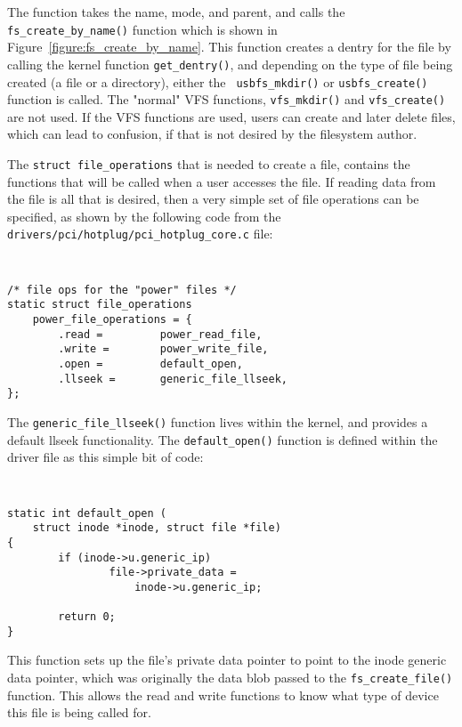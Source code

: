 \documentclass[twocolumn]{article}
\begin{document}
The function takes the name, mode, and parent, and calls the 
{\tt fs\_create\_by\_name()} function which is shown in 
Figure~\ref{figure:fs_create_by_name}.  This function creates a dentry for
the file by calling the kernel function {\tt get\_dentry()}, and depending
on the type of file being created (a file or a directory), either the {\tt
usbfs\_mkdir()} or {\tt usbfs\_create()} function is called.  The "normal"
VFS functions, {\tt vfs\_mkdir()} and {\tt vfs\_create()} are not used.  If
the VFS functions are used, users can create and later delete files, which
can lead to confusion, if that is not desired by the filesystem author.

The {\tt struct file\_operations} that is needed to create a file, contains
the functions that will be called when a user accesses the file.  If
reading data from the file is all that is desired, then a very simple set
of file operations can be specified, as shown by the following code from
the {\tt drivers/pci/hotplug/pci\_hotplug\_core.c} file:
{\tt \small
\begin{verbatim}
/* file ops for the "power" files */
static struct file_operations 
    power_file_operations = {
        .read =         power_read_file,
        .write =        power_write_file,
        .open =         default_open,
        .llseek =       generic_file_llseek,
};
\end{verbatim}
}

The {\tt generic\_file\_llseek()} function lives within the kernel, and
provides a default llseek functionality.  The {\tt default\_open()}
function is defined within the driver file as this simple bit of code:
{\tt \small
\begin{verbatim}
static int default_open (
    struct inode *inode, struct file *file)
{
        if (inode->u.generic_ip)
                file->private_data = 
                    inode->u.generic_ip;

        return 0;
}
\end{verbatim}
}

This function sets up the file's private data pointer to point to the inode
generic data pointer, which was originally the data blob passed to the 
{\tt fs\_create\_file()} function.  This allows the read and write
functions to know what type of device this file is being called for.
\end{document}
